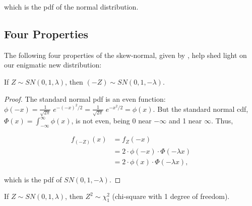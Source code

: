 \documentclass{article}
\begin{document}
which is the pdf of the normal distribution.

\subsection{Four Properties}
\label{subsec:four-properties}

The following four properties of the skew-normal, given by \citet{main}, help
shed light on our enigmatic new distribution:

\begin{property} \label{prop:1}
  If $Z \sim SN(0, 1, \lambda)$, then $(-Z) \sim SN(0, 1, -\lambda)$.
\end{property}

\begin{proof}
  The standard normal pdf is an even function: $\phi(-x) =
  \frac{1}{\sqrt{2\pi}}\;e^{-(-x)^2/2} = \frac{1}{\sqrt{2\pi}}\;e^{-x^2/2} =
  \phi(x)$. But the standard normal cdf, \thinspace $\Phi(x) =
  \int_{-\infty}^\infty \phi(x)$, \thinspace is not even, being 0 near
  $-\infty$ and 1 near $\infty$. Thus,
  
  \begin{align*}
    f_{(-Z)}(x) &= f_Z(-x) \\
    & = 2 \cdot \phi(-x) \cdot \Phi (-\lambda x) \\
    & = 2 \cdot \phi(x) \cdot \Phi (-\lambda x),
  \end{align*}

  which is the pdf of $SN(0, 1, -\lambda)$.
\end{proof}

\begin{property} \label{prop:2}
  If $Z \sim SN(0, 1, \lambda)$, then $Z^2 \sim \chi^2_1$ (chi-square with 1 degree of freedom).
\end{property}
\end{document}
